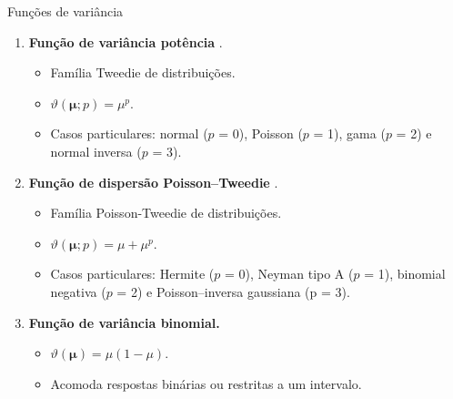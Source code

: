 \documentclass[
  ignorenonframetext,
  serif,
  professionalfont,
  usenames,
  dvipsnames,
  aspectratio = 169]{beamer}
\begin{document}
\begin{frame}{Funções de variância}
\protect\hypertarget{funuxe7uxf5es-de-variuxe2ncia}{}
\begin{enumerate}
  \item \textbf{Função de variância potência} \citep{Jorgensen87, Jorgensen97}.
  
    \begin{itemize}
      \item Família Tweedie de distribuições.
      \item $\vartheta\left(\boldsymbol{\mu}; p\right) = \mu^p$.
      \item Casos particulares: normal ($p$ = 0), Poisson ($p$ = 1), gama ($p$ = 2) e normal inversa ($p$ = 3).
    \end{itemize}

  
  \item \textbf{Função de dispersão Poisson–Tweedie} \citep{Jorgensen15}.
  
    \begin{itemize}
      \item Família Poisson-Tweedie de distribuições.
      \item $\vartheta\left(\boldsymbol{\mu}; p\right) = \mu + \mu^p$.
      \item Casos particulares: Hermite ($p$ = 0), Neyman tipo A ($p$ = 1), binomial negativa ($p$ = 2) e Poisson–inversa gaussiana (p = $3$).
      
    \end{itemize}

  \item \textbf{Função de variância binomial.} 
  
    \begin{itemize}
      \item $\vartheta(\boldsymbol{\mu}) = \mu(1 - \mu)$.
      \item Acomoda respostas binárias ou restritas a um intervalo.
    \end{itemize}

\end{enumerate}
\end{frame}
\end{document}
